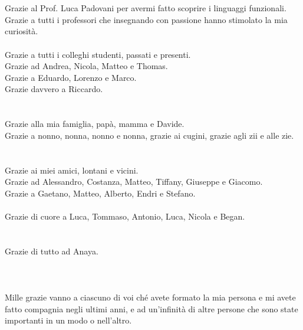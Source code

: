 \chapter*{}
\label{chap:8-thanks}

Grazie al Prof. Luca Padovani per avermi fatto scoprire i linguaggi funzionali. \\
Grazie a tutti i professori che insegnando con passione hanno stimolato la mia curiosità. \\
\\
Grazie a tutti i colleghi studenti, passati e presenti. \\
Grazie ad Andrea, Nicola, Matteo e Thomas. \\
Grazie a Eduardo, Lorenzo e Marco. \\
Grazie davvero a Riccardo. \\
\\
\\
Grazie alla mia famiglia, papà, mamma e Davide. \\
Grazie a nonno, nonna, nonno e nonna, grazie ai cugini, grazie agli zii e alle zie. \\
\\
\\
Grazie ai miei amici, lontani e vicini. \\
Grazie ad Alessandro, Costanza, Matteo, Tiffany, Giuseppe e Giacomo. \\
Grazie a Gaetano, Matteo, Alberto, Endri e Stefano. \\
\\
Grazie di cuore a Luca, Tommaso, Antonio, Luca, Nicola e Began. \\
\\
\\
Grazie di tutto ad Anaya.
\\
\\
\\
\\
Mille grazie vanno a ciascuno di voi ché avete formato la mia persona e mi avete fatto compagnia
negli ultimi anni, e ad un'infinità di altre persone che sono state importanti in un modo o nell'altro.